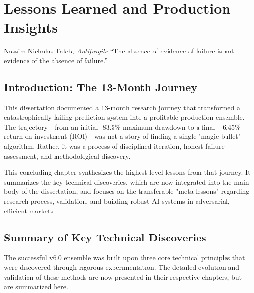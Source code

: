 \chapter{Lessons Learned and Production Insights}
\label{chap:lessons-learned}

\begin{chapquote}{Nassim Nicholas Taleb, \textit{Antifragile}}
``The absence of evidence of failure is not evidence of the absence of failure.''
\end{chapquote}

\section{Introduction: The 13-Month Journey}

This dissertation documented a 13-month research journey that transformed a catastrophically failing prediction system into a profitable production ensemble. The trajectory---from an initial -83.5\% maximum drawdown to a final +6.45\% return on investment (ROI)---was not a story of finding a single "magic bullet" algorithm. Rather, it was a process of disciplined iteration, honest failure assessment, and methodological discovery.

This concluding chapter synthesizes the highest-level lessons from that journey. It summarizes the key technical discoveries, which are now integrated into the main body of the dissertation, and focuses on the transferable "meta-lessons" regarding research process, validation, and building robust AI systems in adversarial, efficient markets.

\section{Summary of Key Technical Discoveries}

The successful v6.0 ensemble was built upon three core technical principles that were discovered through rigorous experimentation. The detailed evolution and validation of these methods are now presented in their respective chapters, but are summarized here.

